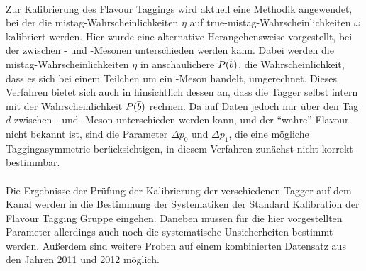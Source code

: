 \\
Zur Kalibrierung des Flavour Taggings wird aktuell eine Methodik angewendet, bei der die mistag-Wahrscheinlichkeiten $\eta$ auf true-mistag-Wahrscheinlichkeiten $\omega$ kalibriert werden. Hier wurde eine alternative Herangehensweise vorgestellt, bei der zwischen \Bz- und \Bzb-Mesonen unterschieden werden kann. Dabei werden die mistag-Wahrscheinlichkeiten $\eta$ in anschaulichere $P({\overline {{b}}})$, die Wahrscheinlichkeit, dass es sich bei einem Teilchen um ein \Bz-Meson handelt, umgerechnet. Dieses Verfahren bietet sich auch in hinsichtlich dessen an, dass die Tagger selbst intern mit der Wahrscheinlichkeit $P({\overline {{b}}})$ rechnen. Da auf Daten jedoch nur über den Tag $d$ zwischen \Bz- und \Bzb-Meson unterschieden werden kann, und der \enquote{wahre} Flavour nicht bekannt ist, sind die Parameter $\Delta p_0$ und $\Delta p_1$, die eine mögliche Taggingasymmetrie berücksichtigen, in diesem Verfahren zunächst nicht korrekt bestimmbar.\\
\\
Die Ergebnisse der Prüfung der Kalibrierung der verschiedenen Tagger auf dem Kanal \BdToDpi werden in die Bestimmung der Systematiken der Standard Kalibration der Flavour Tagging Gruppe eingehen. Daneben müssen für die hier vorgestellten Parameter allerdings auch noch die systematische Unsicherheiten bestimmt werden. Außerdem sind weitere Proben auf einem kombinierten Datensatz aus den Jahren \num{2011} und \num{2012} möglich. 